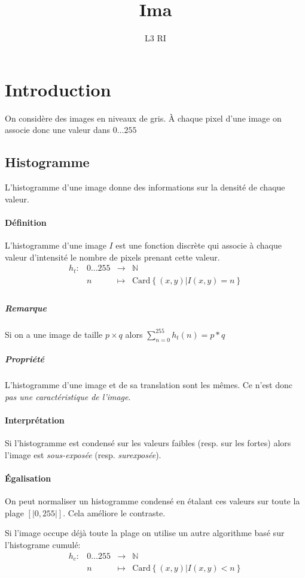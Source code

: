 \documentclass[french]{article}
\title{Ima}
\date{}
\author{L3 RI}
\begin{document}
\maketitle
\tableofcontents
\newpage

\section{Introduction}
On considère des images en niveaux de gris. À chaque pixel d'une image
on associe donc une valeur dans ${0\dots255}$
\subsection{Histogramme}
L'histogramme d'une image donne des informations sur la densité de
chaque valeur.
\paragraph{Définition} L'histogramme d'une image $I$ est une fonction
discrète qui associe à chaque valeur d’intensité le nombre de pixels
prenant cette valeur.
$$
\begin{array}{rccl}
h_t : & {0\dots255} & \to & \mathbb{N} \\
 & n & \mapsto & \text{Card}\left\{(x,y) | I(x,y) = n\right\}\\
\end{array}
$$
\subparagraph{Remarque} Si on a une image de taille $p\times q$ alors
$\sum_{n = 0}^{255} h_t(n)= p*q$

\subparagraph{Propriété} L'histogramme d'une image et de sa translation
sont les mêmes. Ce n'est donc \emph{pas une caractéristique de l'image}.

\paragraph{Interprétation} Si l'histogramme est condensé sur les valeurs
faibles (resp. sur les fortes) alors l'image est \emph{sous-exposée} (resp.
\emph{surexposée}).

\paragraph{Égalisation} On peut normaliser un histogramme condensé en
étalant ces valeurs sur toute la plage $[|0, 255|]$. Cela améliore le
contraste.

Si l'image occupe déjà toute la plage on utilise un autre algorithme basé
sur l'histograme cumulé:
$$
\begin{array}{rccl}
h_c : & {0\dots255} & \to & \mathbb{N} \\
 & n & \mapsto & \text{Card}\left\{(x,y) | I(x,y) < n\right\}\\
\end{array}
$$
\end{document}
